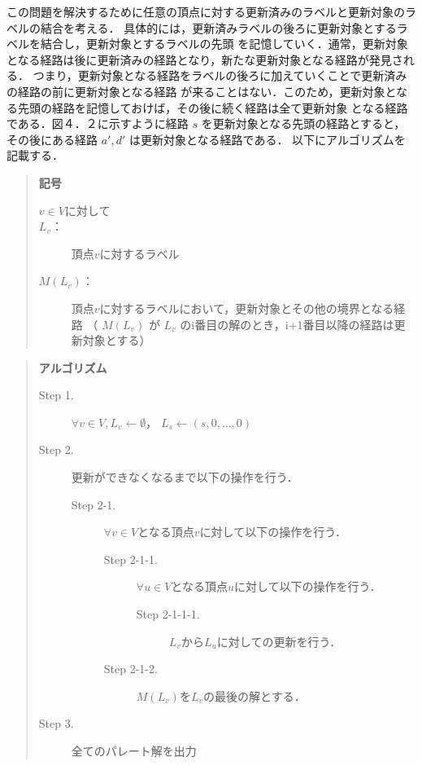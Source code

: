 \documentclass[12pt]{optlab-bachelor}
\begin{document}
この問題を解決するために任意の頂点に対する更新済みのラベルと更新対象のラベルの結合を考える．
具体的には，更新済みラベルの後ろに更新対象とするラベルを結合し，更新対象とするラベルの先頭
を記憶していく．通常，更新対象となる経路は後に更新済みの経路となり，新たな更新対象となる経路が発見される．
つまり，更新対象となる経路をラベルの後ろに加えていくことで更新済みの経路の前に更新対象となる経路
が来ることはない．このため，更新対象となる先頭の経路を記憶しておけば，その後に続く経路は全て更新対象
となる経路である．図４．２に示すように経路 $s$ を更新対象となる先頭の経路とすると，その後にある経路 $a',d'$
は更新対象となる経路である．
以下にアルゴリズムを記載する．

\begin{quote}
  \textbf{記号}
  \begin{description}
    \item[$v \in V$に対して]
    \item[$L_v$：] 頂点$v$に対するラベル
    \item[$M(L_v)$：] 頂点$v$に対するラベルにおいて，更新対象とその他の境界となる経路
    （ $M(L_v)$ が $L_v$ のi番目の解のとき，i+1番目以降の経路は更新対象とする）
  \end{description}
\end{quote}

\begin{quote}
  \textbf{アルゴリズム}
  \begin{description}
    \item[Step 1.] $\forall v \in V , L_v \leftarrow \emptyset$，
    $L_s \leftarrow (s,0,\ldots,0)$
    \item[Step 2.] 更新ができなくなるまで以下の操作を行う．
    \begin{description}
      \item[Step 2-1.] $\forall v \in V$となる頂点$v$に対して以下の操作を行う．
      \begin{description}
        \item[Step 2-1-1.] $\forall u \in V$となる頂点$u$に対して以下の操作を行う．
        \begin{description}
          \item[Step 2-1-1-1.] $L_v$から$L_u$に対しての更新を行う．
        \end{description}
        \item[Step 2-1-2.] $M(L_v)$を$L_v$の最後の解とする．
      \end{description}
    \end{description}
    \item[Step 3.] 全てのパレート解を出力
  \end{description}
\end{quote}
\end{document}
